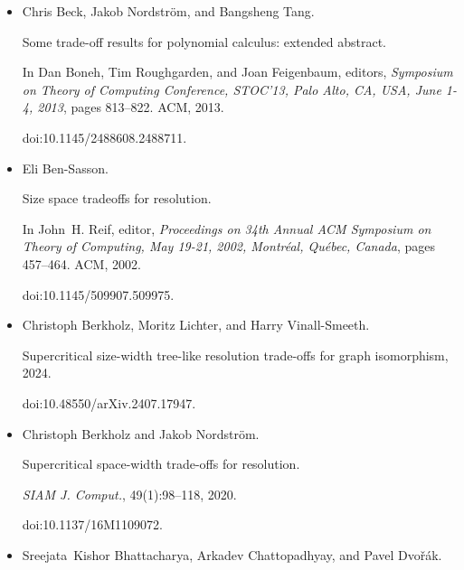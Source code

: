 \begin{itemize}
doi:10.4230/LIPICS.ITCS.2023.14.





\item[] 
[5]

Chris Beck, Jakob Nordström, and Bangsheng Tang.


Some trade-off results for polynomial calculus: extended abstract.


In Dan Boneh, Tim Roughgarden, and Joan Feigenbaum, editors, \emph{Symposium on Theory of Computing Conference, STOC’13, Palo Alto, CA, USA,
June 1-4, 2013}, pages 813–822. ACM, 2013.


doi:10.1145/2488608.2488711.





\item[] 
[6]

Eli Ben-Sasson.


Size space tradeoffs for resolution.


In John H. Reif, editor, \emph{Proceedings on 34th Annual ACM
Symposium on Theory of Computing, May 19-21, 2002, Montréal,
Québec, Canada}, pages 457–464. ACM, 2002.


doi:10.1145/509907.509975.





\item[] 
[7]

Christoph Berkholz, Moritz Lichter, and Harry Vinall-Smeeth.


Supercritical size-width tree-like resolution trade-offs for graph
isomorphism, 2024.


doi:10.48550/arXiv.2407.17947.





\item[] 
[8]

Christoph Berkholz and Jakob Nordström.


Supercritical space-width trade-offs for resolution.


\emph{SIAM J. Comput.}, 49(1):98–118, 2020.


doi:10.1137/16M1109072.





\item[] 
[9]

Sreejata Kishor Bhattacharya, Arkadev Chattopadhyay, and Pavel Dvořák.



\end{itemize}
